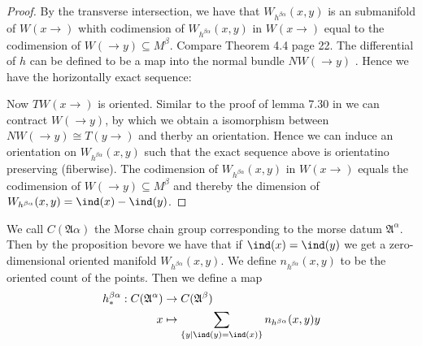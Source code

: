 \begin{proof} 
	By the transverse intersection, we have that $W_{h^{\beta\alpha}}(x,y)$ is an submanifold of $W(x \to)$ whith codimension of $W_{h^{\beta\alpha}}(x,y)$ in $W(x \to)$ equal to the codimension of $W(\to y)\subseteq M^{\beta}$. Compare \cite{Hirsch1994} Theorem 4.4 page 22. The differential of $h$ can be defined to be a map into the normal bundle $NW(\to y)$ . Hence we have the horizontally exact sequence:
	
	Now $TW(x \to)$ is oriented. Similar to the proof of lemma 7.30 in \cite{Seez2024} we can contract $W(\to y)$, by which we obtain a isomorphism between $NW(\to y)\cong T(y\to)$ and therby an orientation. Hence we can induce an orientation on $W_{h^{\beta\alpha}}(x,y)$ such that the exact sequence above is orientatino preserving (fiberwise). The codimension of $W_{h^{\beta\alpha}}(x,y)$ in $W(x \to)$ equals the codimension of $W(\to y)\subseteq M^{\beta}$ and thereby the dimension of $W_{h^{\beta\alpha}}(x,y)=\ind(x)-\ind(y)$.
\end{proof}
\begin{definition}
	We call $C(\mathfrak{A} {\alpha})$ the Morse chain group corresponding to the morse datum $\mathfrak{A}^{\alpha}$. Then by the proposition bevore we have that if $\ind(x)=\ind(y)$ we get a zero-dimensional oriented manifold $W_{h^{\beta\alpha}}(x,y)$. We define $n_{h^{\beta\alpha}}(x,y)$ to be the oriented count of the points. Then we define a map
	\begin{align}
		h_*^{\beta\alpha}: C(\mathfrak{A}^{\alpha}) & \to C(\mathfrak{A}^{\beta}) \\
		x & \mapsto \sum_{\{y|\ind(y)=\ind(x)\}}n_{h^{\beta\alpha}}(x,y) y
	\end{align}
\end{definition}
